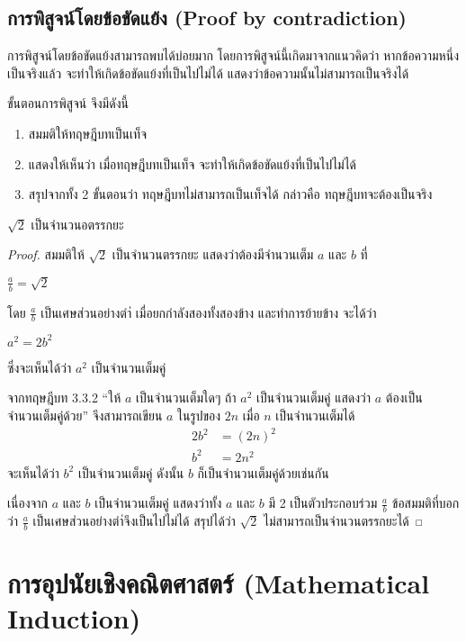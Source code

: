 \subsection{การพิสูจน์โดยข้อขัดแย้ง (Proof by contradiction)}

การพิสูจน์โดยข้อขัดแย้งสามารถพบได้บ่อยมาก โดยการพิสูจน์นี้เกิดมาจากแนวคิดว่า หากข้อความหนึ่งเป็นจริงแล้ว จะทำให้เกิดข้อขัดแย้งที่เป็นไปไม่ได้ แสดงว่าข้อความนั้นไม่สามารถเป็นจริงได้

ขั้นตอนการพิสูจน์ จึงมีดังนี้
\begin{enumerate}
\item สมมติให้ทฤษฎีบทเป็นเท็จ
\item แสดงให้เห็นว่า เมื่อทฤษฎีบทเป็นเท็จ จะทำให้เกิดข้อขัดแย้งที่เป็นไปไม่ได้
\item สรุปจากทั้ง 2 ขั้นตอนว่า ทฤษฎีบทไม่สามารถเป็นเท็จได้ กล่าวคือ ทฤษฎีบทจะต้องเป็นจริง
\end{enumerate}

\begin{theorem}
$\sqrt{2}$ เป็นจำนวนอตรรกยะ
\end{theorem}

\begin{proof}
สมมติให้ $\sqrt{2}$ เป็นจำนวนตรรกยะ แสดงว่าต้องมีจำนวนเต็ม $a$ และ $b$ ที่
\begin{center}
$\frac{a}{b}=\sqrt{2}$
\end{center}
โดย $\frac{a}{b}$ เป็นเศษส่วนอย่างตำ่ เมื่อยกกำลังสองทั้งสองข้าง และทำการย้ายข้าง จะได้ว่า
\begin{center}
$a^2=2b^2$
\end{center}
ซึ่งจะเห็นได้ว่า $a^2$ เป็นจำนวนเต็มคู่

จากทฤษฎีบท 3.3.2 ``ให้ $a$ เป็นจำนวนเต็มใดๆ ถ้า $a^2$ เป็นจำนวนเต็มคู่ แสดงว่า $a$ ต้องเป็นจำนวนเต็มคู่ด้วย'' จึงสามารถเขียน $a$  ในรูปของ $2n$ เมื่อ $n$ เป็นจำนวนเต็มได้
\begin{align*}
2b^2 &= (2n)^2 \\
b^2 &= 2n^2
\end{align*}
จะเห็นได้ว่า $b^2$ เป็นจำนวนเต็มคู่ ดังนั้น $b$ ก็เป็นจำนวนเต็มคู่ด้วยเช่นกัน

เนื่องจาก $a$ และ $b$ เป็นจำนวนเต็มคู่ แสดงว่าทั้ง $a$ และ $b$ มี 2 เป็นตัวประกอบร่วม $\frac{a}{b}$  ข้อสมมติที่บอกว่า $\frac{a}{b}$ เป็นเศษส่วนอย่างตำ่จึงเป็นไปไม่ได้ สรุปได้ว่า $\sqrt{2}$ ไม่สามารถเป็นจำนวนตรรกยะได้
\end{proof}

\section{การอุปนัยเชิงคณิตศาสตร์ (Mathematical Induction)}
